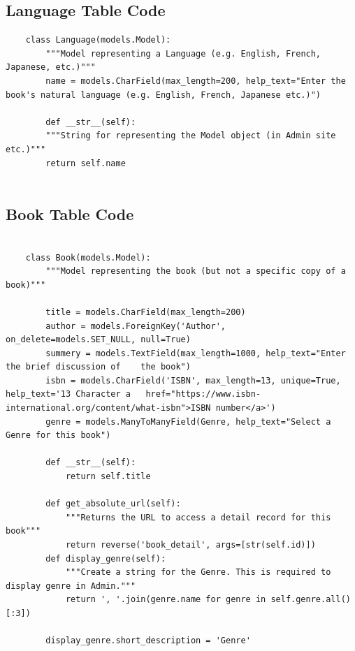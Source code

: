 \documentclass[12pt, a4paper]{report}
\begin{document}
\subsection{Language Table Code}
\begin{lstlisting}
	class Language(models.Model):
		"""Model representing a Language (e.g. English, French, Japanese, etc.)"""
		name = models.CharField(max_length=200, help_text="Enter the book's natural language (e.g. English, French, Japanese etc.)")
	
		def __str__(self):
		"""String for representing the Model object (in Admin site etc.)"""
		return self.name
	
\end{lstlisting}
\newpage
\subsection{Book Table Code}
\begin{lstlisting}
	
	class Book(models.Model):
		"""Model representing the book (but not a specific copy of a book)"""
	
		title = models.CharField(max_length=200)
		author = models.ForeignKey('Author', on_delete=models.SET_NULL, null=True)
		summery = models.TextField(max_length=1000, help_text="Enter the brief discussion of 	the book")
		isbn = models.CharField('ISBN', max_length=13, unique=True, help_text='13 Character a 	href="https://www.isbn-international.org/content/what-isbn">ISBN number</a>')
		genre = models.ManyToManyField(Genre, help_text="Select a Genre for this book")
	
		def __str__(self):
			return self.title
	
		def get_absolute_url(self):
			"""Returns the URL to access a detail record for this book"""
			return reverse('book_detail', args=[str(self.id)])
		def display_genre(self):
			"""Create a string for the Genre. This is required to display genre in Admin."""
			return ', '.join(genre.name for genre in self.genre.all()[:3])
	
		display_genre.short_description = 'Genre'
\end{lstlisting}
\newpage
\end{document}
